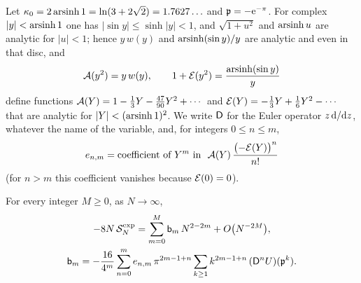 Let $\kappa_0=2\operatorname{arsinh}1=\ln(3+2\sqrt2)=1.7627\ldots$ and $\mathfrak{p}=-\mathrm{e}^{-\pi}$.
For complex $|y|<\operatorname{arsinh}1$ one has $|\sin y|\le\sinh|y|<1$, and $\sqrt{1+u^{2}}$ and $\operatorname{arsinh} u$ are analytic for
$|u|<1$; hence $y\,w(y)$ and $\operatorname{arsinh}(\sin y)/y$ are analytic and even in that disc, and
\begin{equation}\label{appB_expansion:eq-AE}
  \mathcal{A}(y^{2})=y\,w(y),\qquad 1+\mathcal{E}(y^{2})=\frac{\operatorname{arsinh}(\sin y)}{y}
\end{equation}
define functions $\mathcal{A}(Y)=1-\tfrac13Y-\tfrac{47}{90}Y^{2}+\cdots$ and $\mathcal{E}(Y)=-\tfrac13Y+\tfrac16Y^{2}-\cdots$
that are analytic for $|Y|<(\operatorname{arsinh}1)^{2}$. We write $\mathsf{D}$ for the Euler operator $z\,\mathrm{d}/\mathrm{d} z$, whatever
the name of the variable, and, for integers $0\le n\le m$,
\begin{equation}\label{appB_expansion:eq-enm}
  e_{n,m}=\text{coefficient of }Y^{m}\text{ in }\ \appBA(Y)\,\frac{\bigl(-\appBE(Y)\bigr)^{n}}{n!}
\end{equation}
(for $n>m$ this coefficient vanishes because $\mathcal{E}(0)=0$).

\begin{lemma}\label{appB_expansion:lem-exp}
For every integer $M\ge0$, as $N\to\infty$,
\begin{equation}\label{appB_expansion:eq-exp}
\begin{gathered}
  -8N\,\mathcal S^{\mathrm{exp}}_N=\sum_{m=0}^{M}\mathsf{b}_m\,N^{2-2m}+O\bigl(N^{-2M}\bigr),\\
  \mathsf{b}_m=-\frac{16}{4^{m}}\sum_{n=0}^{m}e_{n,m}\,\pi^{2m-1+n}\sum_{k\ge1}k^{2m-1+n}\,(\mathsf{D}^{n}U)(\mathfrak{p}^{k}).
\end{gathered}
\end{equation}
\end{lemma}

